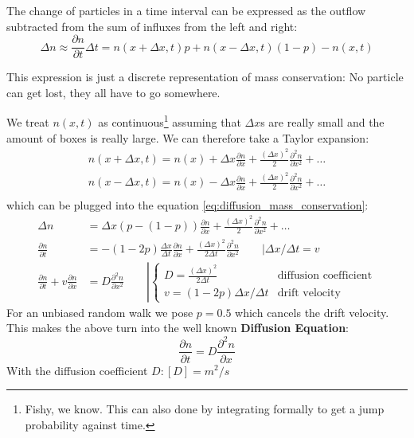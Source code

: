 The change of particles in a time interval can be expressed as the outflow subtracted from the sum of influxes from the left and right:
\begin{equation}
	\Delta n \approx \frac{\partial n}{\partial t}\Delta t = n(x+\Delta x,t)p + n(x-\Delta x, t)(1-p)-n(x,t)
	\label{eq:diffusion_mass_conservation}
\end{equation}

This expression is just a discrete representation of mass conservation: No particle can get lost, they all have to go somewhere.

We treat $n(x,t)$ as continuous\footnote{Fishy, we know. This can also done by integrating formally to get a jump probability against time.} assuming that $\Delta x$s are really small and the amount of boxes is really large. We can therefore take a Taylor expansion:
\begin{equation*}
	\begin{split}
		n(x+\Delta x,t) = n(x)+\Delta x \frac{\partial n}{\partial x} + \frac{(\Delta x)^2}2 \frac{\partial ^2 n}{\partial x^2} + \dots \\
		n(x-\Delta x,t) = n(x)-\Delta x \frac{\partial n}{\partial x} + \frac{(\Delta x)^2}2 \frac{\partial ^2 n}{\partial x^2} + \dots \\
	\end{split}
\end{equation*}
which can be plugged into the equation \eqref{eq:diffusion_mass_conservation}:
\begin{equation*}
	\begin{split}
		\Delta n  &= \Delta x(p - (1-p))\frac{\partial n}{\partial x} + \frac{(\Delta x)^2}2\frac{\partial^2 n}{\partial x^2}+ \dots\\
		\frac{\partial n}{\partial t} &= -(1-2p)\frac{\Delta x}{\Delta t} \frac{\partial n}{\partial x} + \frac{(\Delta x)^2}{2\Delta t} \frac{\partial ^2 n}{\partial x^2}\qquad \left | \Delta x/ \Delta  t = v \right.\\
		\frac{\partial n}{\partial t} + v \frac{\partial n}{\partial x} &= D\frac{\partial ^2 n}{\partial x^2} \qquad \left | 
		\begin{cases}D = \frac{(\Delta x)^2}{2\Delta t} & \text{diffusion coefficient}\\ v=  (1-2p)\Delta x/\Delta t& \text{drift velocity}\end{cases}
		\right .
	\end{split}
\end{equation*}
For an unbiased random walk we pose $p=0.5$ which cancels the drift velocity. This makes the above turn into the well known \textbf{Diffusion Equation}:
\begin{equation}
	\boxed{\frac{\partial n}{\partial t} = D\frac{\partial ^2 n}{\partial x}}
	\label{eq:diffusion_1d}
\end{equation}
With the diffusion coefficient $D: [D]=m^2/s$

